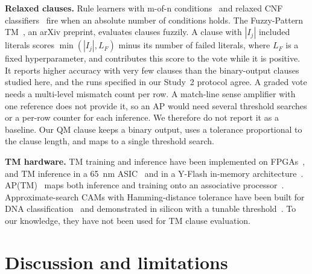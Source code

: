 \documentclass[preprint,12pt,times]{elsarticle}
\begin{document}
\textbf{Relaxed clauses.}
Rule learners with m-of-n conditions~\cite{murphy1991mofn,towell1993extracting} and relaxed CNF classifiers~\cite{ghosh2020relaxed} fire when an absolute number of conditions holds.
The Fuzzy-Pattern TM~\cite{hnilov2025fptm}, an arXiv preprint, evaluates clauses fuzzily. A clause with $|I_j|$ included literals scores $\min(|I_j|, L_F)$ minus its number of failed literals, where $L_F$ is a fixed hyperparameter, and contributes this score to the vote while it is positive.
It reports higher accuracy with very few clauses than the binary-output clauses studied here, and the runs specified in our Study~2 protocol agree.
A graded vote needs a multi-level mismatch count per row.
A match-line sense amplifier with one reference does not provide it, so an AP would need several threshold searches or a per-row counter for each inference.
We therefore do not report it as a baseline.
Our QM clause keeps a binary output, uses a tolerance proportional to the clause length, and maps to a single threshold search.

\textbf{TM hardware.}
TM training and inference have been implemented on FPGAs~\cite{tunheim2023ctmfpga,tunheim2025fpga,wheeldon2020learning}, and TM inference in a \SI{65}{nm} ASIC~\cite{tunheim2025asic} and in a Y-Flash in-memory architecture~\cite{ghazal2025impact}.
AP(TM)~\cite{shrot2026aptm} maps both inference and training onto an associative processor~\cite{yavits2015ap}.
Approximate-search CAMs with Hamming-distance tolerance have been built for DNA classification~\cite{garzon2022hdcam,jahshan2023dashcam} and demonstrated in silicon with a tunable threshold~\cite{garzon2025jssc}.
To our knowledge, they have not been used for TM clause evaluation.

\section{Discussion and limitations}
\label{sec:discussion}
\end{document}
